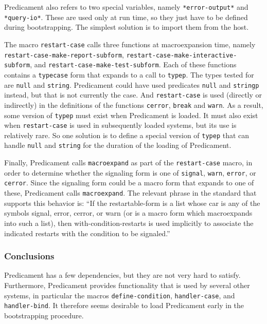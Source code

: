Predicament also refers to two special variables, namely
\texttt{*error-output*} and \texttt{*query-io*}.  These are used only
at run time, so they just have to be defined during bootstrapping.
The simplest solution is to import them from the host.

The macro \texttt{restart-case} calls three functions at
macroexpansion time, namely \texttt{restart-case-make-report-subform},
\texttt{restart-case-make-interactive-subform}, and
\texttt{restart-case-make-test-subform}.  Each of these functions
contains a \texttt{typecase} form that expands to a call to
\texttt{typep}.  The types tested for are \texttt{null} and
\texttt{string}.  Predicament could have used predicates \texttt{null}
and \texttt{stringp} instead, but that is not currently the case.  And
\texttt{restart-case} is used (directly or indirectly) in the
definitions of the functions \texttt{cerror}, \texttt{break} and
\texttt{warn}.  As a result, some version of \texttt{typep} must exist
when Predicament is loaded.  It must also exist when
\texttt{restart-case} is used in subsequently loaded systems, but its
use is relatively rare.  So one solution is to define a special
version of \texttt{typep} that can handle \texttt{null} and
\texttt{string} for the duration of the loading of Predicament.

Finally, Predicament calls \texttt{macroexpand} as part of the
\texttt{restart-case} macro, in order to determine whether the
signaling form is one of \texttt{signal}, \texttt{warn},
\texttt{error}, or \texttt{cerror}.  Since the signaling form could be
a macro form that expands to one of these, Predicament calls
\texttt{macroexpand}.  The relevant phrase in the standard that
supports this behavior is: ``If the restartable-form is a list whose
car is any of the symbols signal, error, cerror, or warn (or is a
macro form which macroexpands into such a list), then
with-condition-restarts is used implicitly to associate the indicated
restarts with the condition to be signaled.''

\subsubsection{Conclusions}

Predicament has a few dependencies, but they are not very hard to
satisfy.  Furthermore, Predicament provides functionality that is used
by several other systems, in particular the macros
\texttt{define-condition}, \texttt{handler-case}, and
\texttt{handler-bind}.  It therefore seems desirable to load
Predicament early in the bootstrapping procedure.

